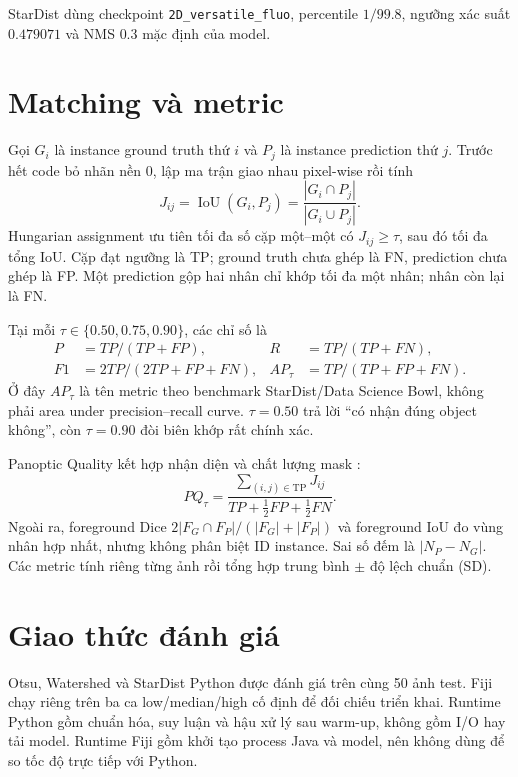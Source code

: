 \documentclass[12pt,a4paper]{report}
\begin{document}
StarDist dùng checkpoint \texttt{2D\_versatile\_fluo}, percentile $1/99.8$,
ngưỡng xác suất $0.479071$ và NMS $0.3$ mặc định của model.

\section{Matching và metric}
\label{sec:matching}
Gọi $G_i$ là instance ground truth thứ $i$ và $P_j$ là instance prediction thứ
$j$. Trước hết code bỏ nhãn nền 0, lập ma trận giao nhau pixel-wise rồi tính
\begin{equation}
 J_{ij}=\operatorname{IoU}(G_i,P_j)=\frac{|G_i\cap P_j|}{|G_i\cup P_j|}.
 \label{eq:instance-iou}
\end{equation}
Hungarian assignment ưu tiên tối đa số cặp một--một có $J_{ij}\geq\tau$,
sau đó tối đa tổng IoU. Cặp đạt ngưỡng là TP; ground truth chưa ghép là FN,
prediction chưa ghép là FP. Một prediction gộp hai nhân chỉ khớp tối đa một
nhân; nhân còn lại là FN.

Tại mỗi $\tau\in\{0.50,0.75,0.90\}$, các chỉ số là
\begin{align}
P&=TP/(TP+FP), & R&=TP/(TP+FN),\\
F1&=2TP/(2TP+FP+FN), & AP_\tau&=TP/(TP+FP+FN).
\end{align}
Ở đây $AP_\tau$ là tên metric theo benchmark StarDist/Data Science Bowl, không
phải area under precision--recall curve. $\tau=0.50$ trả lời ``có nhận đúng
object không'', còn $\tau=0.90$ đòi biên khớp rất chính xác.

Panoptic Quality kết hợp nhận diện và chất lượng mask \citep{kirillov2019panoptic}:
\begin{equation}
 PQ_\tau=\frac{\sum_{(i,j)\in\mathrm{TP}}J_{ij}}
 {TP+\tfrac12FP+\tfrac12FN}.
 \label{eq:pq}
\end{equation}
Ngoài ra, foreground Dice
$2|F_G\cap F_P|/(|F_G|+|F_P|)$ và foreground IoU đo vùng nhân hợp nhất, nhưng
không phân biệt ID instance. Sai số đếm là $|N_P-N_G|$. Các metric tính riêng từng ảnh rồi tổng hợp
trung bình $\pm$ độ lệch chuẩn (SD).

\section{Giao thức đánh giá}
Otsu, Watershed và StarDist Python được đánh giá trên cùng 50 ảnh test.
Fiji chạy riêng trên ba ca low/median/high cố định để đối chiếu triển khai.
Runtime Python gồm chuẩn hóa, suy luận và hậu xử lý sau warm-up, không gồm
I/O hay tải model. Runtime Fiji gồm khởi tạo process Java và model, nên
không dùng để so tốc độ trực tiếp với Python.
\end{document}
